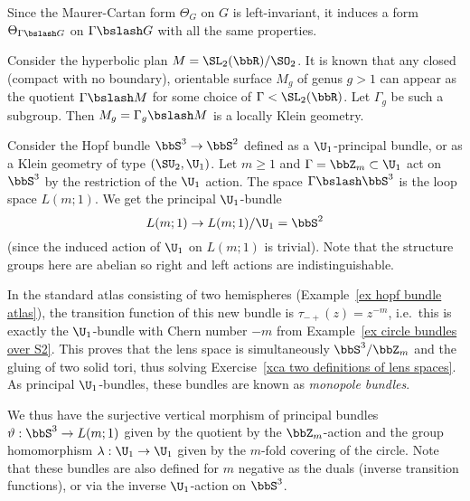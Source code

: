Since the Maurer-Cartan form $\Theta_G$ on $G$ is left-invariant, it induces a form $\Theta_{\Gamma\bslash G}$ on $\Gamma\bslash G$ with all the same properties.


\begin{example}
    Consider the hyperbolic plan $M=\SL_2(\bbR)\slash \SO_2$. It is known that any closed (compact with no boundary), orientable surface $M_g$ of genus $g>1$ can appear as the quotient $\Gamma\bslash M$ for some choice of $\Gamma<\SL_2(\bbR)$. Let $\Gamma_g$ be such a subgroup. Then $M_g=\Gamma_g\bslash M$ is a locally Klein geometry.
\end{example}

\begin{example}\label{ex monopole bundles}
    Consider the Hopf bundle $\bbS^3\to \bbS^2$ defined as a $\U_1$-principal bundle, or as a Klein geometry of type $(\SU_2,\U_1)$. Let $m\geq 1$ and $\Gamma=\bbZ_m\subset \U_1$ act on $\bbS^3$ by the restriction of the $\U_1$ action. The space $\Gamma\bslash \bbS^3$ is the loop space $L(m;1)$. We get the principal $\U_1$-bundle
    \[L(m;1)\to L(m;1)\slash \U_1=\bbS^2\]
    (since the induced action of $\U_1$ on $L(m;1)$ is trivial).
    Note that the structure groups here are abelian so right and left actions are indistinguishable.
    
    In the standard atlas consisting of two hemispheres (Example~\ref{ex hopf bundle atlas}), the transition function of this new bundle is $\tau_{-+}(z)=z^{-m}$, i.e.\ this is exactly the $\U_1$-bundle with Chern number $-m$ from Example~\ref{ex circle bundles over S2}. This proves that the lens space is simultaneously $\bbS^3\slash \bbZ_m$ and the gluing of two solid tori, thus solving Exercise~\ref{xca two definitions of lens spaces}. As principal $\U_1$-bundles, these bundles are known as \emph{monopole bundles}.

    We thus have the surjective vertical morphism of principal bundles $\vartheta:\bbS^3\to L(m;1)$ given by the quotient by the $\bbZ_m$-action and the group homomorphism $\lambda:\U_1\to \U_1$ given by the $m$-fold covering of the circle. Note that these bundles are also defined for $m$ negative as the duals (inverse transition functions), or via the inverse $\U_1$-action on $\bbS^3$.
\end{example}













